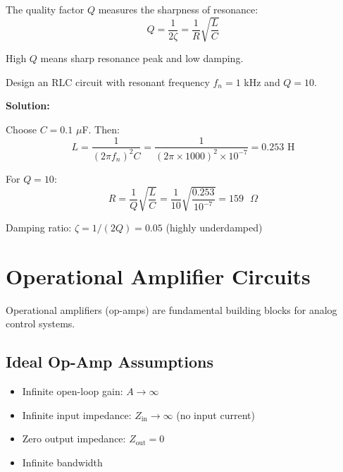The quality factor $Q$ measures the sharpness of resonance:
\begin{equation}
Q = \frac{1}{2\zeta} = \frac{1}{R}\sqrt{\frac{L}{C}}
\end{equation}

High $Q$ means sharp resonance peak and low damping.

\begin{examplebox}[title=Example 1.7: RLC Circuit Design]
Design an RLC circuit with resonant frequency $f_n = 1$ kHz and $Q = 10$.

\textbf{Solution:}

Choose $C = 0.1$ $\mu$F. Then:
\begin{equation}
L = \frac{1}{(2\pi f_n)^2 C} = \frac{1}{(2\pi \times 1000)^2 \times 10^{-7}} = 0.253 \text{ H}
\end{equation}

For $Q = 10$:
\begin{equation}
R = \frac{1}{Q}\sqrt{\frac{L}{C}} = \frac{1}{10}\sqrt{\frac{0.253}{10^{-7}}} = 159 \text{ }\Omega
\end{equation}

Damping ratio: $\zeta = 1/(2Q) = 0.05$ (highly underdamped)
\end{examplebox}



\section{Operational Amplifier Circuits}
\label{sec:opamp}

Operational amplifiers (op-amps) are fundamental building blocks for analog control systems.

\subsection{Ideal Op-Amp Assumptions}

\begin{itemize}
    \item Infinite open-loop gain: $A \to \infty$
    \item Infinite input impedance: $Z_{\text{in}} \to \infty$ (no input current)
    \item Zero output impedance: $Z_{\text{out}} = 0$
    \item Infinite bandwidth
\end{itemize}

